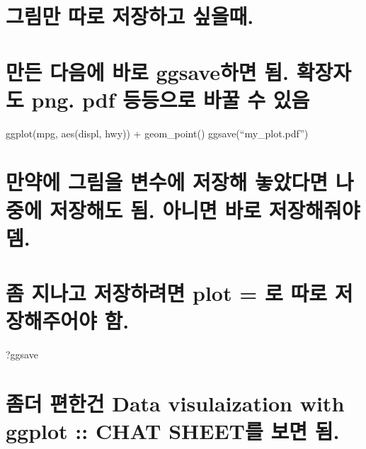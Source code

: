 \documentclass[]{article}
\begin{document}
\section{그림만 따로 저장하고 싶을때.}\label{---.}

\section{만든 다음에 바로 ggsave하면 됨. 확장자도 png. pdf 등등으로 바꿀
수 있음}\label{---ggsave-.--png.-pdf----}

ggplot(mpg, aes(displ, hwy)) + geom\_point() ggsave(``my\_plot.pdf'')

\section{만약에 그림을 변수에 저장해 놓았다면 나중에 저장해도 됨. 아니면
바로 저장해줘야뎀.}\label{-------.---.}

\section{좀 지나고 저장하려면 plot = 로 따로 저장해주어야
함.}\label{---plot----.}

?ggsave

\section{좀더 편한건 Data visulaization with ggplot :: CHAT SHEET를 보면
됨.}\label{--data-visulaization-with-ggplot-chat-sheet--.}
\end{document}
